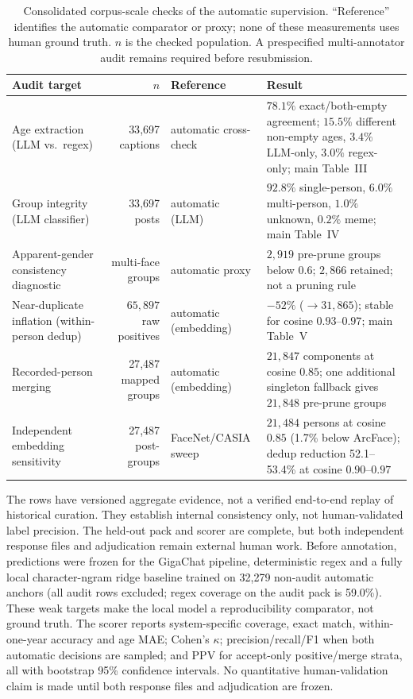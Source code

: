 \documentclass[journal]{IEEEtran}
\newcommand{\maintab}[1]{main Table~#1}
\begin{document}
\begin{table}[!t]
\renewcommand{\arraystretch}{1.25}
\caption{Consolidated corpus-scale checks of the automatic supervision. ``Reference'' identifies the
automatic comparator or proxy; none of these measurements uses human ground truth. $n$ is the checked
population. A prespecified multi-annotator audit remains required before resubmission.}
\label{tab:auditfull}
\centering
\footnotesize
\begin{tabular}{@{}p{}rp{}p{}@{}}
\toprule
Audit target & $n$ & Reference & Result \\
\midrule
Age extraction (LLM vs.\ regex) & 33{,}697 captions & automatic cross-check & $78.1\%$ exact/both-empty agreement; $15.5\%$ different non-empty ages, $3.4\%$ LLM-only, $3.0\%$ regex-only; \maintab{III} \\
Group integrity (LLM classifier) & 33{,}697 posts & automatic (LLM) & $92.8\%$ single-person, $6.0\%$ multi-person, $1.0\%$ unknown, $0.2\%$ meme; \maintab{IV} \\
Apparent-gender consistency diagnostic & multi-face groups & automatic proxy & $2{,}919$ pre-prune groups below $0.6$; $2{,}866$ retained; not a pruning rule \\
Near-duplicate inflation (within-person dedup) & $65{,}897$ raw positives & automatic (embedding) & $-52\%$ ($\to 31{,}865$); stable for cosine $0.93$--$0.97$; \maintab{V} \\
Recorded-person merging & 27{,}487 mapped groups & automatic (embedding) & $21{,}847$ components at cosine $0.85$; one additional singleton fallback gives $21{,}848$ pre-prune groups \\
Independent embedding sensitivity & 27{,}487 post-groups & FaceNet/CASIA sweep & $21{,}484$ persons at cosine $0.85$ (1.7\% below ArcFace); dedup reduction 52.1--53.4\% at cosine $0.90$--$0.97$ \\
\bottomrule
\end{tabular}
\end{table}

The rows have versioned aggregate evidence, not a verified end-to-end replay of historical curation.
They establish internal consistency only, not human-validated label precision. The held-out pack and scorer
are complete, but both independent response files and adjudication remain external human work. Before
annotation, predictions were frozen for the GigaChat pipeline, deterministic regex and a fully local
character-ngram ridge baseline trained on 32{,}279 non-audit automatic anchors (all audit rows excluded;
regex coverage on the audit pack is 59.0\%). These weak targets make the local model a reproducibility
comparator, not ground truth. The scorer reports system-specific coverage, exact match, within-one-year
accuracy and age MAE; Cohen's $\kappa$; precision/recall/F1 when both automatic decisions are sampled;
and PPV for accept-only positive/merge strata, all with bootstrap 95\% confidence intervals. No quantitative
human-validation claim is made until both response files and adjudication are frozen.
\end{document}
